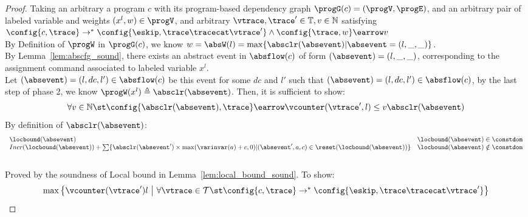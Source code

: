 \begin{proof}
  Taking an arbitrary a program ${c}$ with its program-based dependency graph 
  $\progG(c) = (\progV, \progE)$, 
  and an arbitrary pair of labeled variable and weights $(x^l, w) \in \progV$, 
  and arbitrary $\vtrace, \trace' \in \mathbb{T},
  v \in \mathbb{N}$ satisfying
  \\
  $\config{{c}, \trace} \to^{*} \config{\eskip, \trace\tracecat\vtrace'} 
  \land 
  \config{\trace, w} \earrow v$
  \\
  By Definition of $\progW$ in $\progG(c)$, we know 
  $  w = \absW(l) = \max \{ \absclr(\absevent) | \absevent = (l, \_, \_)\}$.
  \\
  By Lemma~\ref{lem:abscfg_sound}, there exists an abstract event in $\absflow(c)$ of form $(\absevent) = (l, \_, \_)$,
  corresponding to the assignment command associated to labeled variable $x^l$. 
  \\
  Let $(\absevent) = (l, dc, l') \in \absflow(c)$ be this event for some $dc$ and $l'$ such that  $(\absevent) = (l, dc, l') \in \absflow(c)$,
  by the last step of phase 2, we know
  $
  \progW(x^l) 
  \triangleq \absclr(\absevent)
  $.
   Then, it is sufficient to show:
  \[
  \forall v \in \mathbb{N} \st 
  \config{\absclr(\absevent), \trace} \earrow 
  \vcounter(\vtrace', l) \leq v
  \absclr(\absevent)
  \]
  By definition of $\absclr(\absevent)$:
  \[
 \begin{array}{ll}
  \locbound(\absevent) & \locbound(\absevent) \in \constdom \\
  Incr(\locbound(\absevent)) + 
  \sum\{\absclr(\absevent') \times \max(\varinvar(a) + c, 0) | (\absevent', a, c) \in \reset(\locbound(\absevent))\} 
  & \locbound(\absevent) \notin \constdom
\end{array}
\]
  \caseL{$\locbound(\absevent) \in \constdom$}
  \\
  Proved by the soundness of Local bound in Lemma~\ref{lem:local_bound_sound}.
  \caseL{$\locbound(\absevent) \notin \constdom$}
To show:
\[
  \begin{array}{l}
    \max \left\{ \vcounter(\vtrace') l ~ \middle\vert~
\forall \vtrace \in \mathcal{T} \st \config{{c}, \trace} \to^{*} \config{\eskip, \trace\tracecat\vtrace'} \right\} 

\end{array}\]
\end{proof}
